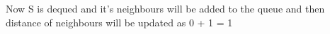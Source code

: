\documentclass[preview]{standalone}
\begin{document}
\begin{center}
Now S is dequed and it's neighbours will be added to the queue and then distance of neighbours will be updated as 0 + 1 = 1
\end{center}
\end{document}
